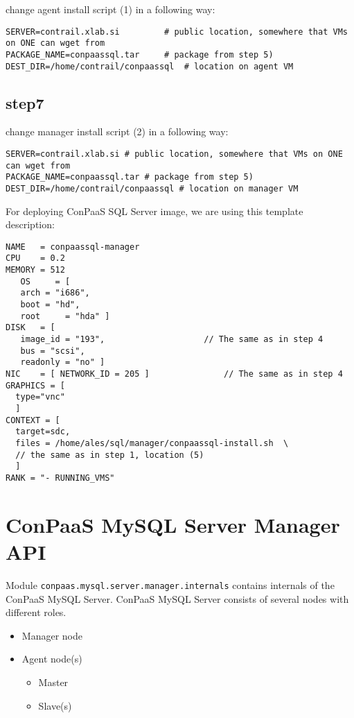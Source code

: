 \documentclass[a4paper,10pt]{article}
\begin{document}
change agent install script (1) in a following way:

\begin{verbatim}
SERVER=contrail.xlab.si			# public location, somewhere that VMs on ONE can wget from
PACKAGE_NAME=conpaassql.tar		# package from step 5)
DEST_DIR=/home/contrail/conpaassql	# location on agent VM
\end{verbatim}

\subsection*{step7}

change manager install script (2) in a following way:

\begin{verbatim}
SERVER=contrail.xlab.si # public location, somewhere that VMs on ONE can wget from
PACKAGE_NAME=conpaassql.tar # package from step 5)
DEST_DIR=/home/contrail/conpaassql # location on manager VM
\end{verbatim}

For deploying ConPaaS SQL Server image, we are using this template description:

\begin{verbatim}
NAME   = conpaassql-manager
CPU    = 0.2
MEMORY = 512
   OS     = [
   arch = "i686",
   boot = "hd",
   root     = "hda" ]
DISK   = [
   image_id = "193",					// The same as in step 4
   bus = "scsi",
   readonly = "no" ]
NIC    = [ NETWORK_ID = 205 ]				// The same as in step 4
GRAPHICS = [
  type="vnc"
  ]
CONTEXT = [
  target=sdc,
  files = /home/ales/sql/manager/conpaassql-install.sh 	\
  // the same as in step 1, location (5)
  ]
RANK = "- RUNNING_VMS"
\end{verbatim}

\section{ConPaaS MySQL Server Manager API}

Module {\tt conpaas.mysql.server.manager.internals} contains internals of the ConPaaS MySQL Server. ConPaaS MySQL Server consists of several nodes with different roles.

\begin{itemize}
	\item Manager node
	\item Agent node(s)
	\begin{itemize}
		\item Master
		\item Slave(s)
	\end{itemize}	
\end{itemize}
\end{document}
